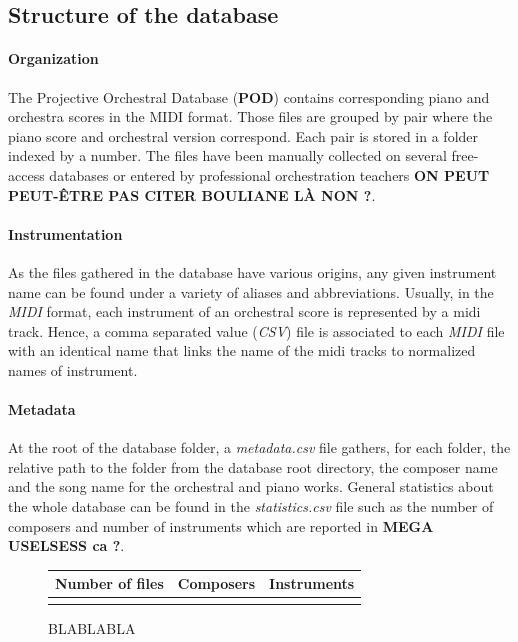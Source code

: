 \documentclass[twoside,twocolumn]{article}
\begin{document}
\subsection{Structure of the database}
\paragraph{Organization}
The Projective Orchestral Database (\textbf{POD}) contains corresponding piano and orchestra scores in the MIDI format.
Those files are grouped by pair where the piano score and orchestral version correspond.
Each pair is stored in a folder indexed by a number.
The files have been manually collected on several free-access databases \cite{imslp} or entered by professional orchestration teachers \textbf{ON PEUT PEUT-ÊTRE PAS CITER BOULIANE LÀ NON ?}.

\paragraph{Instrumentation}
As the files gathered in the database have various origins, any given instrument name can be found under a variety of aliases and abbreviations. 
Usually, in the \textit{MIDI} format, each instrument of an orchestral score is represented by a midi track.
Hence, a comma separated value (\textit{CSV}) file is associated to each \textit{MIDI} file with an identical name that links the name of the midi tracks to normalized names of instrument.

\paragraph{Metadata}
At the root of the database folder, a \textit{metadata.csv} file gathers, for each folder, the relative path to the folder from the database root directory, the composer name and the song name for the orchestral and piano works.
General statistics about the whole database can be found in the \textit{statistics.csv} file such as the number of composers and number of instruments which are reported in  \textbf{MEGA USELSESS ca ?}.
\begin{figure}
\centering
\begin{tabular}{lll}
   Number of files & Composers & Instruments\\
   \hline
    &  & 
   \\
\end{tabular}
\caption{BLABLABLA}
\label{tab:stats}
\end{figure}
\end{document}
